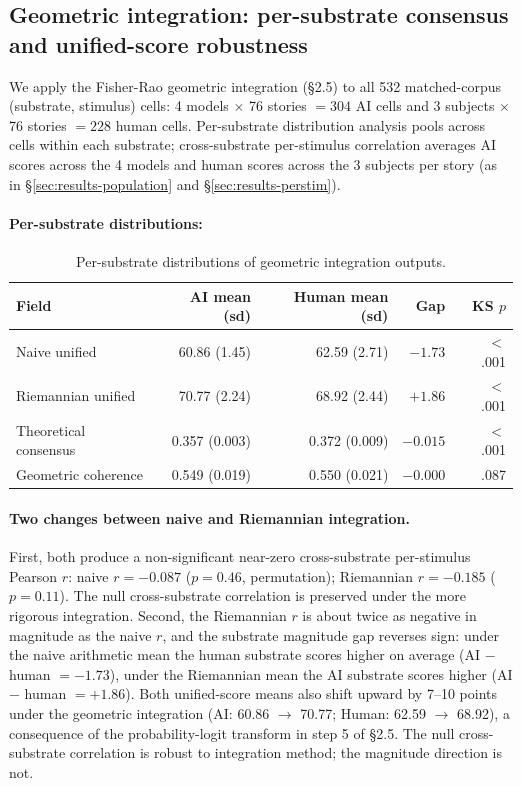 \documentclass[11pt,a4paper]{article}
\begin{document}
\subsection{Geometric integration: per-substrate consensus and unified-score robustness}
\label{sec:results-geometric}

We apply the Fisher-Rao geometric integration (\S2.5) to all 532 matched-corpus (substrate, stimulus) cells: 4 models $\times$ 76 stories $= 304$ AI cells and 3 subjects $\times$ 76 stories $= 228$ human cells. Per-substrate distribution analysis pools across cells within each substrate; cross-substrate per-stimulus correlation averages AI scores across the 4 models and human scores across the 3 subjects per story (as in \S\ref{sec:results-population} and \S\ref{sec:results-perstim}).

\paragraph{Per-substrate distributions:}

\begin{table}[h]
\centering
\small
\begin{tabular}{lrrrr}
\toprule
\textbf{Field} & \textbf{AI mean (sd)} & \textbf{Human mean (sd)} & \textbf{Gap} & \textbf{KS $p$} \\
\midrule
Naive unified           & 60.86 (1.45)  & 62.59 (2.71)  & $-1.73$ & $<$ .001 \\
Riemannian unified      & 70.77 (2.24)  & 68.92 (2.44)  & $+1.86$ & $<$ .001 \\
Theoretical consensus   & 0.357 (0.003) & 0.372 (0.009) & $-0.015$ & $<$ .001 \\
Geometric coherence     & 0.549 (0.019) & 0.550 (0.021) & $-0.000$ & .087 \\
\bottomrule
\end{tabular}
\caption{Per-substrate distributions of geometric integration outputs.}
\end{table}

\paragraph{Two changes between naive and Riemannian integration.} First, both produce a non-significant near-zero cross-substrate per-stimulus Pearson $r$: naive $r = -0.087$ ($p = 0.46$, permutation); Riemannian $r = -0.185$ ($p = 0.11$). The null cross-substrate correlation is preserved under the more rigorous integration. Second, the Riemannian $r$ is about twice as negative in magnitude as the naive $r$, and the substrate magnitude gap reverses sign: under the naive arithmetic mean the human substrate scores higher on average (AI $-$ human $= -1.73$), under the Riemannian mean the AI substrate scores higher (AI $-$ human $= +1.86$). Both unified-score means also shift upward by 7--10 points under the geometric integration (AI: 60.86 $\rightarrow$ 70.77; Human: 62.59 $\rightarrow$ 68.92), a consequence of the probability-logit transform in step 5 of \S2.5. The null cross-substrate correlation is robust to integration method; the magnitude direction is not.
\end{document}
